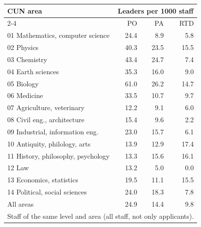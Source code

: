 \documentclass[11pt,a4paper]{article}
\begin{document}
\begin{table}[H]
\centering
\small
\begin{tabular}{lrrr}
\toprule
\multirow{2}{*}{CUN area} & \multicolumn{3}{c}{Leaders per 1000 staff} \\
\cmidrule(lr){2-4}
 & PO & PA & RTD \\
\midrule
01 Mathematics, computer science & 24.4 & 8.9 & 5.8 \\
02 Physics & 40.3 & 23.5 & 15.5 \\
03 Chemistry & 43.4 & 24.7 & 7.4 \\
04 Earth sciences & 35.3 & 16.0 & 9.0 \\
05 Biology & 61.0 & 26.2 & 14.7 \\
06 Medicine & 33.5 & 10.7 & 9.7 \\
07 Agriculture, veterinary & 12.2 & 9.1 & 6.0 \\
08 Civil eng., architecture & 15.4 & 9.6 & 2.2 \\
09 Industrial, information eng. & 23.0 & 15.7 & 6.1 \\
10 Antiquity, philology, arts & 13.9 & 12.9 & 17.4 \\
11 History, philosophy, psychology & 13.3 & 15.6 & 16.1 \\
12 Law & 13.2 & 5.0 & 0.0 \\
13 Economics, statistics & 19.5 & 11.1 & 15.5 \\
14 Political, social sciences & 24.0 & 18.3 & 7.8 \\
\midrule
All areas & 24.9 & 14.4 & 9.8 \\
\bottomrule
\multicolumn{4}{l}{\footnotesize Staff of the same level and area (all staff, not only applicants).} \\
\end{tabular}
\end{table}
\end{document}

